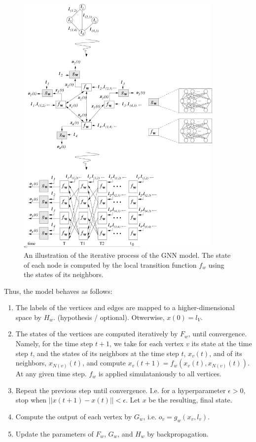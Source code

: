 \documentclass[12pt]{article}
\begin{document}
    \begin{figure}[h]
        \centering
        \includegraphics[width=0.9\textwidth]{img/An-illustration-of-the-iterative-process-of-the-GNN-model-The-state-of-each-node.png}
        \caption{An illustration of the iterative process of the GNN model. The state of each node is computed by the local transition function $f_w$ using the states of its neighbors.}
        \label{fig:iterative_process}
    \end{figure}

    Thus, the model behaves as follows:
    \begin{enumerate}
        \item The labels of the vertices and edges are mapped to a higher-dimensional space by $H_w$. (hypothesis / optional). Otwerwise, $x(0) = l_V$.
        \item The states of the vertices are computed iteratively by $F_w$, until convergence. Namely, for the time step $t+1$, we take for each vertex $v$ its state at the time step $t$, and the states of its neighbors at the time step $t$, $x_v(t)$, and of its neighbors, $x_{N(v)}(t)$, and compute $x_v(t+1) = f_w(x_v(t), x_{N(v)}(t))$. At any given time step. $f_w$ is applied simulataniously to all vertices.
        \item Repeat the previous step until convergence. I.e. for a hyperparameter $\epsilon > 0$, stop when $||x(t+1) - x(t)|| < \epsilon$. Let $x$ be the resulting, final state.
        \item Compute the output of each vertex by $G_w$, i.e. $o_v = g_w(x_v, l_v)$.
        \item Update the parameters of $F_w$, $G_w$, and $H_w$ by backpropagation.
    \end{enumerate}
\end{document}

